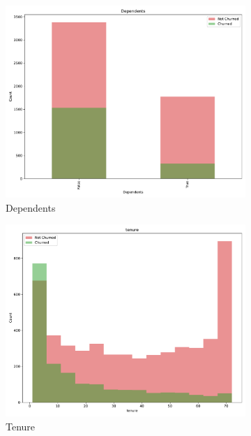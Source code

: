 \documentclass[a4paper,11pt]{article}
\begin{document}
\begin{landscape}
\begin{figure}
\begin{subfigure}{0.14\linewidth}
        \includegraphics[width=\linewidth]{figures/understanding/Dependents.pdf}
        \caption{Dependents}
    \end{subfigure}
    \begin{subfigure}{0.14\linewidth}
        \includegraphics[width=\linewidth]{figures/understanding/tenure.pdf}
        \caption{Tenure}
    \end{subfigure}
    \begin{subfigure}{0.14\linewidth}

\end{subfigure}
\end{figure}
\end{landscape}
\end{document}

